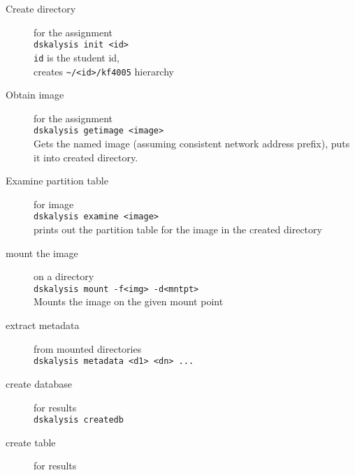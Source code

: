 \documentclass[12pt]{article}
\begin{document}
\begin{description}

	\item[Create directory] for the assignment\\
		\verb'dskalysis init <id>'\\
		\texttt{id} is the student id,\\
		creates \verb'~/<id>/kf4005' hierarchy 

	\item[Obtain image] for the assignment\\
		\verb'dskalysis getimage <image>'\\
		Gets the named image (assuming consistent network address prefix),
		puts it into created directory.

	\item[Examine partition table] for image\\
		\verb'dskalysis examine <image>'\\
		prints out the partition table for the image in the created directory

	\item[mount the image] on a directory\\
		\verb'dskalysis mount -f<img> -d<mntpt>'\\
		Mounts the image on the given mount point

	\item[extract metadata] from mounted directories\\
		\verb'dskalysis metadata <d1> <dn> ...'\\

	\item[create database] for results\\
		\verb'dskalysis createdb'\\

	\item[create table]  for results \\
\end{description}
\end{document}
